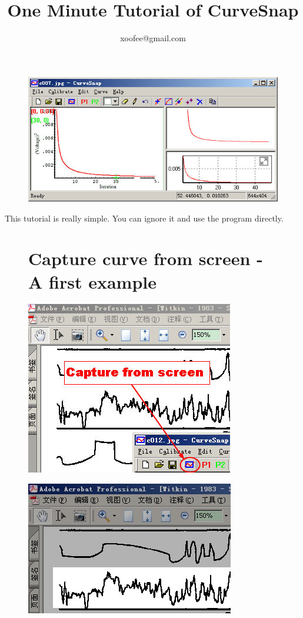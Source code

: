 \documentclass[12pt]{article}
\title{One Minute Tutorial of CurveSnap}
\author{xoofee@gmail.com}
\date{}
\begin{document}
\maketitle
\begin{figure}[ht!]
  \center \includegraphics{./tut_files/00_curvesnap_wide.jpg}
\end{figure}
\tableofcontents

\newpage
This tutorial is really simple. You can ignore it and use the program directly.
\begin{figure}[ht!]
\section{Capture curve from screen - A first example}
  \center \includegraphics{./tut_files/01_capture.jpg}
\end{figure}

\begin{figure}[ht!]
  \center \includegraphics{./tut_files/02_capturing.jpg}
\end{figure}
\end{document}
